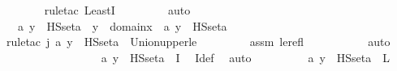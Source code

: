 \begin{isabellebody}
\ \ \ \ \ \ \isamarkupfalse%
{\isacharparenleft}{\kern0pt}rule{\isacharunderscore}{\kern0pt}tac\ LeastI{\isacharparenright}{\kern0pt}\ \isanewline
\ \ \ \ \ \ \isamarkupfalse%
\ auto\isanewline
\ \isanewline
\ \ \ \ \isamarkupfalse%
\ {\isachardoublequoteopen}{\isacharparenleft}{\kern0pt}{\isasymmu}\ a{\isachardot}{\kern0pt}\ y\ {\isasymin}\ HS{\isacharunderscore}{\kern0pt}set{\isacharparenleft}{\kern0pt}a{\isacharparenright}{\kern0pt}{\isacharparenright}{\kern0pt}\ {\isasymle}\ {\isacharparenleft}{\kern0pt}{\isasymUnion}y\ {\isasymin}\ domain{\isacharparenleft}{\kern0pt}x{\isacharparenright}{\kern0pt}{\isachardot}{\kern0pt}\ {\isacharparenleft}{\kern0pt}{\isasymmu}\ a{\isachardot}{\kern0pt}\ y\ {\isasymin}\ HS{\isacharunderscore}{\kern0pt}set{\isacharparenleft}{\kern0pt}a{\isacharparenright}{\kern0pt}{\isacharparenright}{\kern0pt}{\isacharparenright}{\kern0pt}{\isachardoublequoteclose}\ \ \isanewline
\ \ \ \ \ \ \isamarkupfalse%
{\isacharparenleft}{\kern0pt}rule{\isacharunderscore}{\kern0pt}tac\ j{\isacharequal}{\kern0pt}{\isachardoublequoteopen}{\isacharparenleft}{\kern0pt}{\isasymmu}\ a{\isachardot}{\kern0pt}\ y\ {\isasymin}\ HS{\isacharunderscore}{\kern0pt}set{\isacharparenleft}{\kern0pt}a{\isacharparenright}{\kern0pt}{\isacharparenright}{\kern0pt}{\isachardoublequoteclose}\ \ Union{\isacharunderscore}{\kern0pt}upper{\isacharunderscore}{\kern0pt}le{\isacharparenright}{\kern0pt}\ \isanewline
\ \ \ \ \ \ \isamarkupfalse%
\ assm\ le{\isacharunderscore}{\kern0pt}refl\ \isanewline
\ \ \ \ \ \ \ \ \isamarkupfalse%
\ auto\ \isanewline
\ \ \ \ \ \ \isamarkupfalse%
\ \isanewline
\ \ \ \ \isamarkupfalse%
\ \isamarkupfalse%
\ {\isachardoublequoteopen}{\isacharparenleft}{\kern0pt}{\isasymmu}\ a{\isachardot}{\kern0pt}\ y\ {\isasymin}\ HS{\isacharunderscore}{\kern0pt}set{\isacharparenleft}{\kern0pt}a{\isacharparenright}{\kern0pt}{\isacharparenright}{\kern0pt}\ {\isasymle}\ {\isacharparenleft}{\kern0pt}{\isasymUnion}I{\isacharparenright}{\kern0pt}{\isachardoublequoteclose}\ \isamarkupfalse%
\ I{\isacharunderscore}{\kern0pt}def\ \isamarkupfalse%
\ auto\ \isanewline
\ \ \ \ \isamarkupfalse%
\ \isamarkupfalse%
\ {\isachardoublequoteopen}{\isacharparenleft}{\kern0pt}{\isasymmu}\ a{\isachardot}{\kern0pt}\ y\ {\isasymin}\ HS{\isacharunderscore}{\kern0pt}set{\isacharparenleft}{\kern0pt}a{\isacharparenright}{\kern0pt}{\isacharparenright}{\kern0pt}\ {\isacharless}{\kern0pt}\ L{\isachardoublequoteclose}\ \isanewline

\end{isabellebody}
